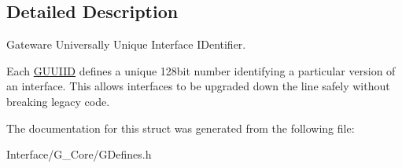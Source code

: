 \subsection{Detailed Description}
Gateware Universally Unique Interface I\+Dentifier. 

Each \mbox{\hyperlink{structGW_1_1GUUIID}{G\+U\+U\+I\+ID}} defines a unique 128bit number identifying a particular version of an interface. This allows interfaces to be upgraded down the line safely without breaking legacy code. 

The documentation for this struct was generated from the following file\+:\begin{DoxyCompactItemize}
\item 
Interface/\+G\+\_\+\+Core/G\+Defines.\+h\end{DoxyCompactItemize}
